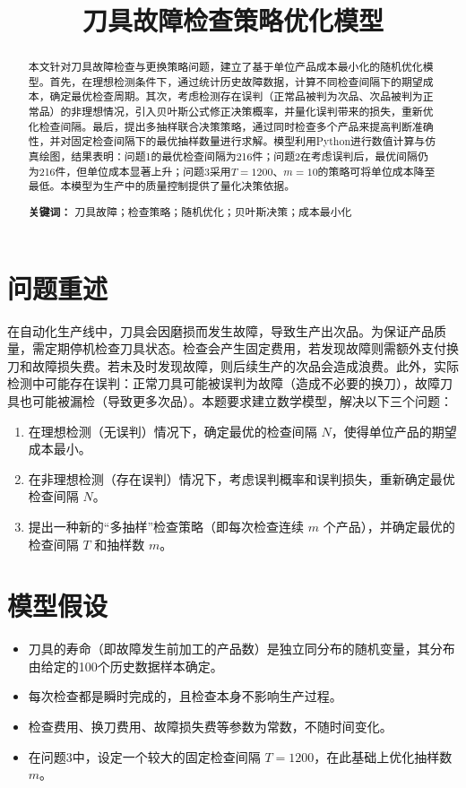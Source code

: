 \documentclass[12pt]{article}
\title{\heiti\zihao{2} 刀具故障检查策略优化模型}
\date{}
\begin{document}
\maketitle

\begin{abstract}
    本文针对刀具故障检查与更换策略问题，建立了基于单位产品成本最小化的随机优化模型。首先，在理想检测条件下，通过统计历史故障数据，计算不同检查间隔下的期望成本，确定最优检查周期。其次，考虑检测存在误判（正常品被判为次品、次品被判为正常品）的非理想情况，引入贝叶斯公式修正决策概率，并量化误判带来的损失，重新优化检查间隔。最后，提出多抽样联合决策策略，通过同时检查多个产品来提高判断准确性，并对固定检查间隔下的最优抽样数量进行求解。模型利用Python进行数值计算与仿真绘图，结果表明：问题1的最优检查间隔为216件；问题2在考虑误判后，最优间隔仍为216件，但单位成本显著上升；问题3采用$T=1200$、$m=10$的策略可将单位成本降至最低。本模型为生产中的质量控制提供了量化决策依据。
    
    \textbf{关键词：} 刀具故障；检查策略；随机优化；贝叶斯决策；成本最小化
\end{abstract}

\section{问题重述}
在自动化生产线中，刀具会因磨损而发生故障，导致生产出次品。为保证产品质量，需定期停机检查刀具状态。检查会产生固定费用，若发现故障则需额外支付换刀和故障损失费。若未及时发现故障，则后续生产的次品会造成浪费。此外，实际检测中可能存在误判：正常刀具可能被误判为故障（造成不必要的换刀），故障刀具也可能被漏检（导致更多次品）。本题要求建立数学模型，解决以下三个问题：
\begin{enumerate}[label=\arabic*.]
    \item 在理想检测（无误判）情况下，确定最优的检查间隔 $N$，使得单位产品的期望成本最小。
    \item 在非理想检测（存在误判）情况下，考虑误判概率和误判损失，重新确定最优检查间隔 $N$。
    \item 提出一种新的“多抽样”检查策略（即每次检查连续 $m$ 个产品），并确定最优的检查间隔 $T$ 和抽样数 $m$。
\end{enumerate}

\section{模型假设}
\begin{itemize}
    \item 刀具的寿命（即故障发生前加工的产品数）是独立同分布的随机变量，其分布由给定的100个历史数据样本确定。
    \item 每次检查都是瞬时完成的，且检查本身不影响生产过程。
    \item 检查费用、换刀费用、故障损失费等参数为常数，不随时间变化。
    \item 在问题3中，设定一个较大的固定检查间隔 $T=1200$，在此基础上优化抽样数 $m$。
\end{itemize}
\end{document}
